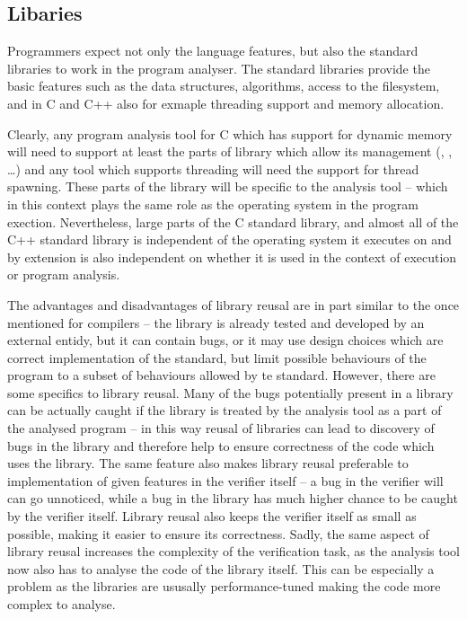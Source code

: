 \subsection{Libaries}

Programmers expect not only the language features, but also the standard
libraries to work in the program analyser.
The standard libraries provide the basic features such as the data structures, algorithms, access to the filesystem, and in C and C++ also for exmaple threading support and memory allocation.

Clearly, any program analysis tool for C which has support for dynamic memory
will need to support at least the parts of library which allow its management
(, , …) and any tool which supports threading will need
the support for thread spawning.
These parts of the library will be specific to the analysis tool -- which in
this context plays the same role as the operating system in the program
exection.
Nevertheless, large parts of the C standard library, and almost all of the C++
standard library is independent of the operating system it executes on and by
extension is also independent on whether it is used in the context of execution
or program analysis.

The advantages and disadvantages of library reusal are in part similar to the
once mentioned for compilers -- the library is already tested and developed by
an external entidy, but it can contain bugs, or it may use design choices which
are correct implementation of the standard, but limit possible behaviours of
the program to a subset of behaviours allowed by te standard.
However, there are some specifics to library reusal.
Many of the bugs potentially present in a library can be actually caught if the
library is treated by the analysis tool as a part of the analysed program -- in
this way reusal of libraries can lead to discovery of bugs in the library and
therefore help to ensure correctness of the code which uses the
library.
The same feature also makes library reusal preferable to implementation of given features in the verifier itself -- a bug in the verifier will can go unnoticed, while a bug in the library has much higher chance to be caught by the verifier itself.
Library reusal also keeps the verifier itself as small as possible, making it easier to ensure its correctness.
Sadly, the same aspect of library reusal increases the complexity of the
verification task, as the analysis tool now also has to analyse the code of the
library itself.
This can be especially a problem as the libraries are ususally performance-tuned making the code more complex to analyse.


